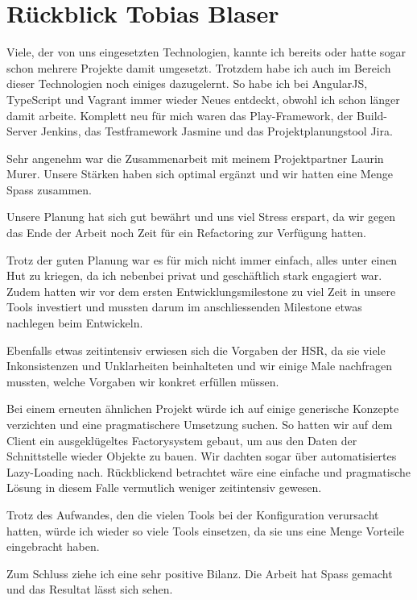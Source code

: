	\section*{Rückblick Tobias Blaser}
		
		
		Viele, der von uns eingesetzten Technologien, kannte ich bereits oder hatte sogar schon mehrere Projekte damit umgesetzt.
		Trotzdem habe ich auch im Bereich dieser Technologien noch einiges dazugelernt.
		So habe ich bei AngularJS, TypeScript und Vagrant immer wieder Neues entdeckt, obwohl ich schon länger damit arbeite.
		Komplett neu für mich waren das Play-Framework, der Build-Server Jenkins, das Testframework Jasmine und das Projektplanungstool Jira.
		
		
		Sehr angenehm war die Zusammenarbeit mit meinem Projektpartner Laurin Murer. Unsere Stärken haben sich optimal ergänzt und wir hatten eine Menge Spass zusammen.
		
		Unsere Planung hat sich gut bewährt und uns viel Stress erspart, da wir gegen das Ende der Arbeit noch Zeit für ein Refactoring zur Verfügung hatten.
		
		
		Trotz der guten Planung war es für mich nicht immer einfach, alles unter einen Hut zu kriegen, da ich nebenbei privat und geschäftlich stark engagiert war.
		Zudem hatten wir vor dem ersten Entwicklungsmilestone zu viel Zeit in unsere Tools investiert und mussten darum im anschliessenden Milestone etwas nachlegen beim Entwickeln.
		
		Ebenfalls etwas zeitintensiv erwiesen sich die Vorgaben der HSR, da sie viele Inkonsistenzen und Unklarheiten beinhalteten und wir einige Male nachfragen mussten, welche Vorgaben wir konkret erfüllen müssen.
		
		
		Bei einem erneuten ähnlichen Projekt würde ich auf einige generische Konzepte verzichten und eine pragmatischere Umsetzung suchen. So hatten wir auf dem Client ein ausgeklügeltes Factorysystem gebaut, um aus den Daten der Schnittstelle wieder Objekte zu bauen.
		Wir dachten sogar über automatisiertes Lazy-Loading nach. 
		Rückblickend betrachtet wäre eine einfache und pragmatische Lösung in diesem Falle vermutlich weniger zeitintensiv gewesen.
		

		Trotz des Aufwandes, den die vielen Tools bei der Konfiguration verursacht hatten, würde ich wieder so viele Tools einsetzen, da sie uns eine Menge Vorteile eingebracht haben.
				
		
		Zum Schluss ziehe ich eine sehr positive Bilanz.
		Die Arbeit hat Spass gemacht und das Resultat lässt sich sehen.